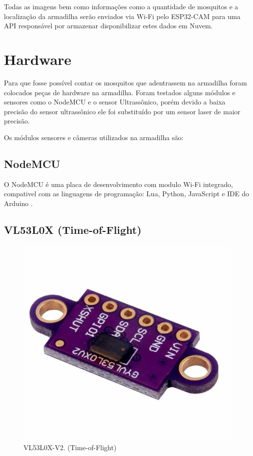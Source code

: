 \documentclass[
	12pt,				%
	openright,			%
	oneside,			%
	a4paper,			%
	chapter=TITLE,		%
	english,			%
	brazil				%
	]{abntex2}
\begin{document}
Todas as imagens bem como informações como a quantidade de mosquitos e a localização da armadilha serão enviados via Wi-Fi pelo ESP32-CAM para uma API responsável por armazenar disponibilizar estes dados em Nuvem.


\section{Hardware}

Para que fosse possível contar os mosquitos que adentrassem na armadilha foram colocados peças de hardware na armadilha. Foram testados alguns módulos e sensores como o NodeMCU e o sensor Ultrassônico, porém devido a baixa precisão do sensor ultrassônico ele foi substituído por um sensor laser de maior precisão.

Os módulos sensores e câmeras utilizados na armadilha são:

\subsection{NodeMCU}

O NodeMCU é uma placa de desenvolvimento com modulo Wi-Fi integrado, compativel com as linguagens de programação: Lua, Python, JavaScript e IDE do Arduino .

\subsection{VL53L0X (Time-of-Flight)}

\begin{figure}[H]
\centering
\includegraphics[scale=0.3]{imagens/gy-vl53l0x.jpg}
\caption{VL53L0X-V2. (Time-of-Flight)}
    \label{fig:gy-vl53l0x}
\end{figure}
\end{document}
